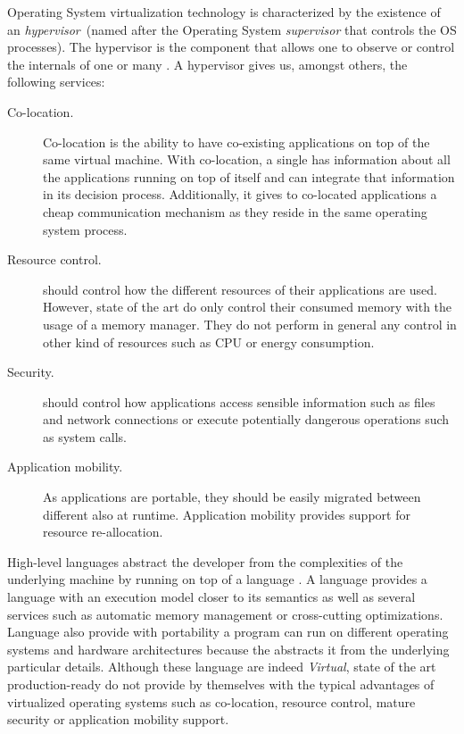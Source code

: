 Operating System virtualization technology is characterized by the existence of an \emph{hypervisor}~(named after the Operating System \emph{supervisor} that controls the OS processes). The hypervisor is the \VM component that allows one to observe or control the internals of one or many \VMs. A \VM hypervisor gives us, amongst others, the following services:

\begin{description}
\item[Co-location.] Co-location is the ability to have co-existing applications on top of the same virtual machine. With co-location, a single \VM has information about all the applications running on top of itself and can integrate that information in its decision process. Additionally, it gives to co-located applications a cheap communication mechanism as they reside in the same operating system process.
\item[Resource control.] \VMs should control how the different resources of their applications are used. However, state of the art \VMs do only control their consumed memory with the usage of a memory manager. They do not perform in general any control in other kind of resources such as CPU or energy consumption.
\item[Security.] \VMs should control how applications access sensible information such as files and network connections or execute potentially dangerous operations such as system calls.
\item[Application mobility.] As applications are portable, they should be easily migrated between different \VMs also at runtime. Application mobility provides support for resource re-allocation.
\end{description}

High-level languages abstract the developer from the complexities of the underlying machine by running on top of a language \VM. A language \VM provides a language with an execution model closer to its semantics as well as several services such as automatic memory management or cross-cutting optimizations. Language \VMs also provide with portability \ie a program can run on different operating systems and hardware architectures because the \VM abstracts it from the underlying particular details. Although these language \VMs are indeed \emph{Virtual}, state of the art production-ready \VMs do not provide by themselves with the typical advantages of virtualized operating systems such as co-location, resource control, mature security or application mobility support.

